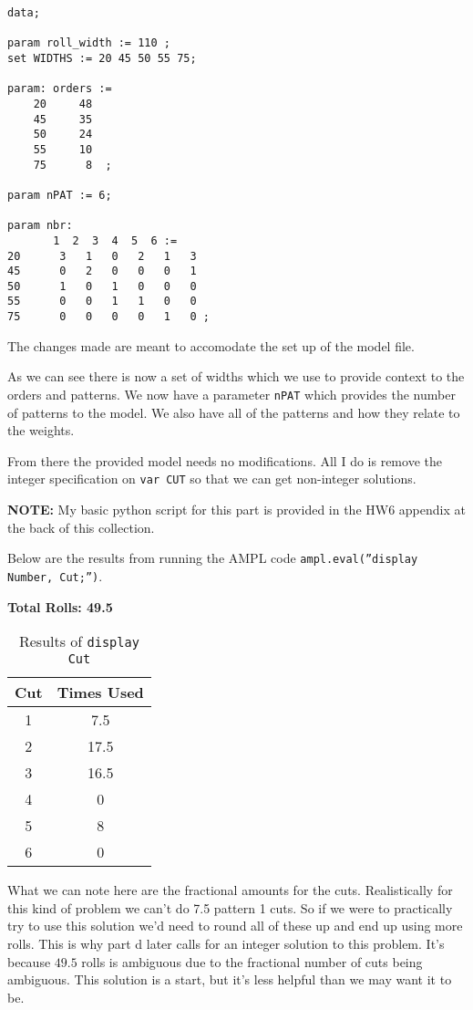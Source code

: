\begin{lstlisting}
data;

param roll_width := 110 ;
set WIDTHS := 20 45 50 55 75;

param: orders :=
    20     48
    45     35
    50     24
    55     10
    75      8  ;

param nPAT := 6;

param nbr:
       1  2  3  4  5  6 :=
20      3   1   0   2   1   3
45      0   2   0   0   0   1
50      1   0   1   0   0   0
55      0   0   1   1   0   0
75      0   0   0   0   1   0 ;

\end{lstlisting}

The changes made are meant to accomodate the set up of the model file. 

As we can see there is now a set of widths which we use to provide context to the orders and patterns. We now have a parameter \texttt{nPAT} which provides the number of patterns to the model. We also have all of the patterns and how they relate to the weights. 

From there the provided model needs no modifications. All I do is remove the integer specification on \texttt{var CUT} so that we can get non-integer solutions. 

\textbf{NOTE:} My basic python script for this part is provided in the HW6 appendix at the back of this collection.

Below are the results from running the AMPL code \texttt{ampl.eval(''display Number, Cut;'')}.

\textbf{Total Rolls: 49.5}

\begin{table}[!ht]
	\centering
	\begin{tabular}{|c|c|}
		\hline
		Cut & Times Used \\
		\hline 
		1 & 7.5 \\
		2 & 17.5 \\
		3 & 16.5 \\
		4 & 0 \\
		5 & 8 \\
		6 & 0 \\
		\hline
	\end{tabular}
	\caption{Results of \texttt{display Cut}}
	\label{tab:<+label+>}
\end{table}

What we can note here are the fractional amounts for the cuts. Realistically for this kind of problem we can't do 7.5 pattern 1 cuts. So if we were to practically try to use this solution we'd need to round all of these up and end up using more rolls. This is why part d later calls for an integer solution to this problem. It's because $49.5$ rolls is ambiguous due to the fractional number of cuts being ambiguous. This solution is a start, but it's less helpful than we may want it to be. 

